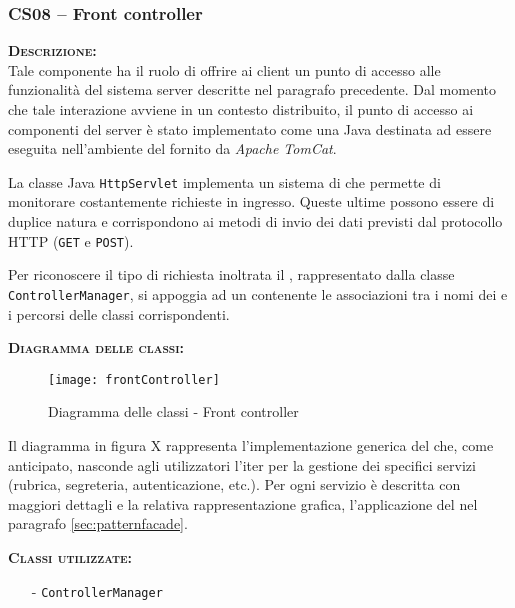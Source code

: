 \subsubsection{CS08 -- Front controller}
\begin{description}
	\item{\scshape\bfseries Descrizione:}\\
Tale componente ha il ruolo di offrire ai client un punto di accesso alle funzionalità del sistema server descritte nel paragrafo precedente. Dal momento che tale interazione avviene in un contesto distribuito, il punto di accesso ai componenti del server è stato implementato come una  Java destinata ad essere eseguita nell'ambiente del  fornito da \textit{Apache TomCat}.

La classe Java \texttt{HttpServlet} implementa un sistema di  che permette di monitorare costantemente richieste in ingresso. Queste ultime possono essere di duplice natura e corrispondono ai metodi di invio dei dati previsti dal protocollo HTTP (\texttt{GET} e \texttt{POST}).

Per riconoscere il tipo di richiesta inoltrata il , rappresentato dalla classe \texttt{ControllerManager}, si appoggia ad un  contenente le associazioni tra i nomi dei  e i percorsi delle classi corrispondenti.

	\item{\scshape\bfseries Diagramma delle classi:}\\
\begin{figure}[H]
  \centering
  \texttt{[image: frontController]}
  \caption{Diagramma delle classi - Front controller}\label{fig:facadeserver}
\end{figure}

Il diagramma in figura X rappresenta l'implementazione generica del  che, come anticipato, nasconde agli utilizzatori l'iter per la gestione dei specifici servizi (rubrica, segreteria, autenticazione, etc.). Per ogni servizio è descritta con maggiori dettagli e la relativa rappresentazione grafica, l'applicazione del  nel paragrafo \vref{sec:patternfacade}.

\item{\scshape\bfseries Classi utilizzate:}\\
	\begin{itemize}[noitemsep,nolistsep]
	  \item[-] \texttt{ControllerManager}
	\end{itemize}

\end{description}
